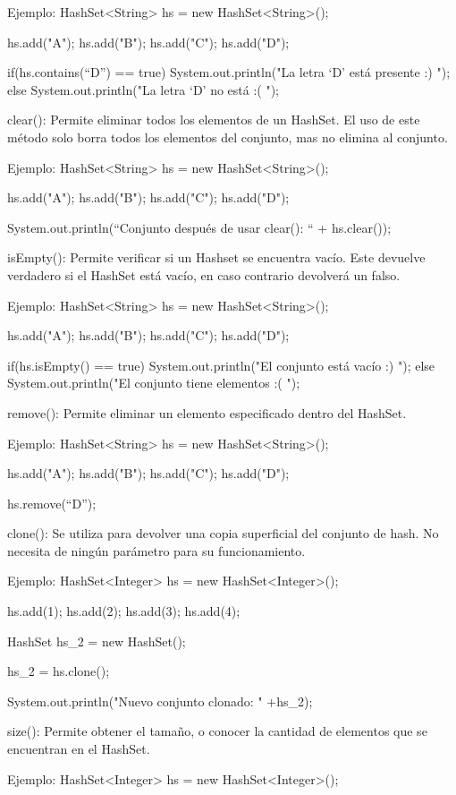 \documentclass[12pt, letterpaper]{article} %
\begin{document}
Ejemplo:
HashSet<String> hs = new HashSet<String>();

hs.add("A");
hs.add("B");
hs.add("C");
hs.add("D");

if(hs.contains(“D”) == true){
System.out.println("La letra ‘D’ está presente :) ");
}
else{
	System.out.println("La letra ‘D’ no está :( ");
}

clear():
Permite eliminar todos los elementos de un HashSet. El uso de este método solo borra todos los elementos del conjunto, mas no elimina al conjunto.

Ejemplo:
HashSet<String> hs = new HashSet<String>();

hs.add("A");
hs.add("B");
hs.add("C");
hs.add("D");

System.out.println(“Conjunto después de usar clear(): “ + hs.clear());


isEmpty():
Permite verificar si un Hashset se encuentra vacío. Este devuelve verdadero si el HashSet está vacío, en caso contrario devolverá un falso.

Ejemplo:
HashSet<String> hs = new HashSet<String>();

hs.add("A");
hs.add("B");
hs.add("C");
hs.add("D");

if(hs.isEmpty() == true){
System.out.println("El conjunto está vacío :) ");
}
else{
	System.out.println("El conjunto tiene elementos :( ");
}


remove():
Permite eliminar un elemento especificado dentro del HashSet.

Ejemplo:
HashSet<String> hs = new HashSet<String>();

hs.add("A");
hs.add("B");
hs.add("C");
hs.add("D");

hs.remove(“D”);


clone():
Se utiliza para devolver una copia superficial del conjunto de hash. No necesita de ningún parámetro para su funcionamiento.

Ejemplo:
HashSet<Integer> hs = new HashSet<Integer>();

hs.add(1);
hs.add(2);
hs.add(3);
hs.add(4);

HashSet hs_2  = new HashSet();

hs_2 = hs.clone();

System.out.println("Nuevo conjunto clonado: " +hs_2);


size():
Permite obtener el tamaño, o conocer la cantidad de elementos que se encuentran en el HashSet.

Ejemplo:
HashSet<Integer> hs = new HashSet<Integer>();
\end{document}
